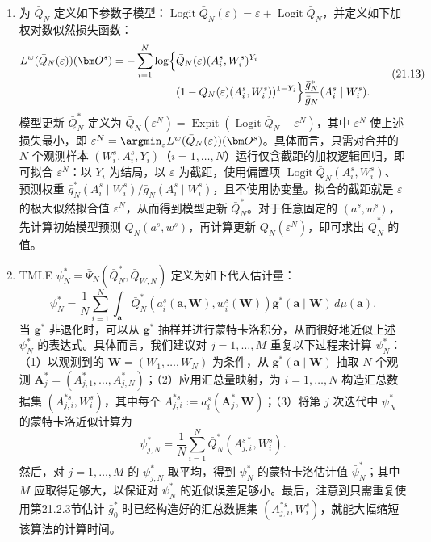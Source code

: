 \begin{enumerate}[label=\arabic*.]
\item 为 $\bar Q_N$ 定义如下参数子模型：$\operatorname{Logit}\bar Q_N(\varepsilon)=\varepsilon+\operatorname{Logit}\bar Q_N$，并定义如下加权对数似然损失函数：
\begin{equation}
 \begin{aligned}
 L^w(\bar Q_N(\varepsilon))(\bm O^s)
 =-\sum_{i=1}^N\log\Bigl\{&\bar Q_N(\varepsilon)(A_i^s,W_i^s)^{Y_i}\\[-.2em]
 &\mathord{}(1-\bar Q_N(\varepsilon)(A_i^s,W_i^s))^{1-Y_i}\Bigr\}
 \frac{\bar g_N^*}{\bar g_N}(A_i^s\mid W_i^s).
 \end{aligned}
 \tag{21.13}
\end{equation}
模型更新 $\bar Q_N^*$ 定义为 $\bar Q_N(\varepsilon^N)=\operatorname{Expit}(\operatorname{Logit}\bar Q_N+\varepsilon^N)$，其中 $\varepsilon^N$ 使上述损失最小，即 $\varepsilon^N=\argmin_\varepsilon L^w(\bar Q_N(\varepsilon))(\bm O^s)$。具体而言，只需对合并的 $N$ 个观测样本 $(W_i^s,A_i^s,Y_i)$（$i=1,\ldots,N$）运行仅含截距的加权逻辑回归，即可拟合 $\varepsilon^N$：以 $Y_i$ 为结局，以 $\varepsilon$ 为截距，使用偏置项 $\operatorname{Logit}\bar Q_N(A_i^s,W_i^s)$、预测权重 $\bar g_N^*(A_i^s\mid W_i^s)/\bar g_N(A_i^s\mid W_i^s)$，且不使用协变量。拟合的截距就是 $\varepsilon$ 的极大似然拟合值 $\varepsilon^N$，从而得到模型更新 $\bar Q_N^*$。对于任意固定的 $(a^s,w^s)$，先计算初始模型预测 $\bar Q_N(a^s,w^s)$，再计算更新 $\bar Q_N(\varepsilon^N)$，即可求出 $\bar Q_N^*$ 的值。

\item TMLE $\psi_N^*=\bar\Psi_N(\bar Q_N^*,\bar Q_{W,N})$ 定义为如下代入估计量：
\begin{equation}
 \psi_N^*=\frac{1}{N}\sum_{i=1}^N\int_{\bm a}
 \bar Q_N^*(a_i^s(\bm a,\bm W),w_i^s(\bm W))
 \bm g^*(\bm a\mid\bm W)\,d\mu(\bm a).
 \tag{21.14}
\end{equation}
当 $\bm g^*$ 非退化时，可以从 $\bm g^*$ 抽样并进行蒙特卡洛积分，从而很好地近似上述 $\psi_N^*$ 的表达式。具体而言，我们建议对 $j=1,\ldots,M$ 重复以下过程来计算 $\psi_N^*$：（1）以观测到的 $\bm W=(W_1,\ldots,W_N)$ 为条件，从 $\bm g^*(\bm a\mid\bm W)$ 抽取 $N$ 个观测 $\bm A_j^*=(A_{j,1}^*,\ldots,A_{j,N}^*)$；（2）应用汇总量映射，为 $i=1,\ldots,N$ 构造汇总数据集 $(A_{j,i}^{*s},W_i^s)$，其中每个 $A_{j,i}^{*s}:=a_i^s(\bm A_j^*,\bm W)$；（3）将第 $j$ 次迭代中 $\psi_N^*$ 的蒙特卡洛近似计算为
\begin{equation}
 \psi_{j,N}^*=\frac{1}{N}\sum_{i=1}^N\bar Q_N^*(A_{j,i}^{s*},W_i^s).
 \tag{21.15}
\end{equation}
然后，对 $j=1,\ldots,M$ 的 $\psi_{j,N}^*$ 取平均，得到 $\psi_N^*$ 的蒙特卡洛估计值 $\bar\psi_N^*$；其中 $M$ 应取得足够大，以保证对 $\psi_N^*$ 的近似误差足够小。最后，注意到只需重复使用第21.2.3节估计 $\bar g_0^*$ 时已经构造好的汇总数据集 $(A_{j,i}^{*s},W_i^s)$，就能大幅缩短该算法的计算时间。
\end{enumerate}
